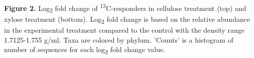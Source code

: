 \textbf{Figure 2.}  Log\textsubscript{2} fold change of \textsuperscript{13}C-responders in cellulose treatment (top) and xylose treatment (bottom).  Log\textsubscript{2} fold change is based on the relative abundance in the experimental treatment compared to the control with the density range 1.7125-1.755 g/ml. Taxa are colored by phylum. 'Counts' is a histogram of number of sequences for each log\textsubscript{2} fold change value.    